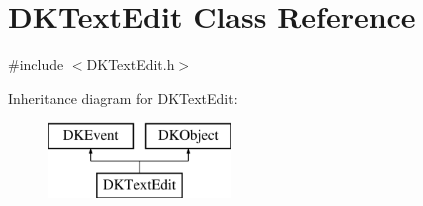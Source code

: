 \hypertarget{class_d_k_text_edit}{\section{D\-K\-Text\-Edit Class Reference}
\label{class_d_k_text_edit}
}


{\ttfamily \#include $<$D\-K\-Text\-Edit.\-h$>$}

Inheritance diagram for D\-K\-Text\-Edit\-:\begin{figure}[H]
\begin{center}
\leavevmode
\includegraphics[height=2.000000cm]{class_d_k_text_edit}
\end{center}
\end{figure}
